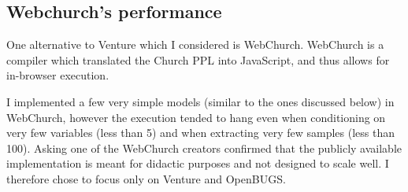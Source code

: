 
\subsection{Webchurch's performance}
One alternative to Venture which I considered is WebChurch. WebChurch is a compiler which translated the Church PPL into JavaScript, and thus allows for in-browser execution.

I implemented a few very simple models (similar to the ones discussed below) in WebChurch, however the execution tended to hang even when conditioning on very few variables (less than 5) and when extracting very few samples (less than 100). Asking one of the WebChurch creators confirmed that the publicly available implementation is meant for didactic purposes and not designed to scale well. I therefore chose to focus only on Venture and OpenBUGS.
